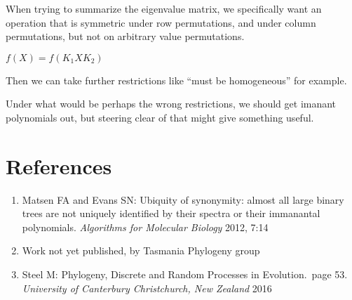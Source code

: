 \documentclass[10pt,a4paper]{report}
\begin{document}
When trying to summarize the eigenvalue matrix, we specifically want an
operation that is symmetric under row permutations, and under column
permutations, but not on arbitrary value permutations.

$f(X) = f(K_1XK_2)$

Then we can take further restrictions like ``must be homogeneous'' for example.

Under what would be perhaps the wrong restrictions, we should get imanant
polynomials out, but steering clear of that might give something useful.

\section{References}

\begin{enumerate}
	\item Matsen FA and Evans SN\@: Ubiquity of synonymity: almost all large
		binary trees are not uniquely identified by their spectra or their
		immanantal polynomials. \textit{Algorithms for Molecular Biology} 2012,
		7:14
	\item Work not yet published, by Tasmania Phylogeny group
	\item Steel M\@: Phylogeny, Discrete and Random Processes in Evolution.\ 
		page 53. \textit{University of Canterbury Christchurch, New Zealand}
		2016
\end{enumerate}
\end{document}
